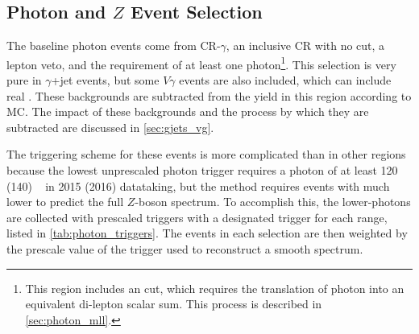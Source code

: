 \subsection{Photon and $Z$ Event Selection}
\label{sec:photon_eventsel}

The baseline photon events come from CR-$\gamma$, an inclusive \ac{CR} with no \met cut, a lepton veto, and the requirement of at least one photon\footnote{This region includes an \HT cut, which requires the translation of photon \pt into an equivalent di-lepton \pt scalar sum. This process is described in \autoref{sec:photon_mll}.}. This selection is very pure in $\gamma$+jet events, but some $V\gamma$ events are also included, which can include real \met. These backgrounds are subtracted from the yield in this region according to \ac{MC}. The impact of these backgrounds and the process by which they are subtracted are discussed in \autoref{sec:gjets_vg}. 

The triggering scheme for these \gjets events is more complicated than in other regions because the lowest unprescaled photon trigger requires a photon \pt of at least 120 (140) \gev~ in 2015 (2016) datataking, but the method requires events with much lower \pt to predict the full $Z$-boson \pt spectrum. To accomplish this, the lower-\pt photons are collected with prescaled triggers with a designated trigger for each \pt range, listed in \autoref{tab:photon_triggers}. The events in each selection are then weighted by the prescale value of the trigger used to reconstruct a smooth \pt spectrum. 

